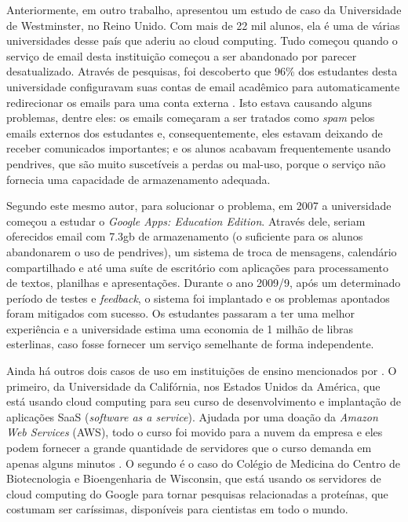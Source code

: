 Anteriormente, em outro trabalho, 
apresentou um estudo de caso da
Universidade de Westminster, no Reino Unido. Com mais de 22 mil alunos, ela é
uma de várias universidades desse país que aderiu ao cloud computing. Tudo
começou quando o serviço de email desta instituição começou a ser abandonado por
parecer desatualizado. Através de pesquisas, foi descoberto que 96\% dos
estudantes desta universidade configuravam suas contas de email acadêmico para
automaticamente redirecionar os emails para uma conta externa
\cite{article-cloud-education-new-dawn}. Isto estava causando alguns problemas,
dentre eles: os emails começaram a ser tratados como \textit{spam} pelos emails
externos dos estudantes e, consequentemente, eles estavam deixando de receber
comunicados importantes; e os alunos acabavam frequentemente usando pendrives,
que são muito suscetíveis a perdas ou mal-uso, porque o serviço não fornecia
uma capacidade de armazenamento adequada.

Segundo este mesmo autor, para solucionar o problema, em 2007 a universidade
começou a estudar o \textit{Google Apps: Education Edition}. Através dele,
seriam oferecidos email com 7.3gb de armazenamento (o suficiente para os alunos
abandonarem o uso de pendrives), um sistema de troca de mensagens, calendário
compartilhado e até uma suíte de escritório com aplicações para processamento de
textos, planilhas e apresentações. Durante o ano 2009/9, após um determinado
período de testes e \textit{feedback}, o sistema foi implantado e os
problemas apontados foram mitigados com sucesso. Os estudantes passaram a ter
uma melhor experiência e a universidade estima uma economia de 1 milhão
de libras esterlinas, caso fosse fornecer um serviço semelhante de forma
independente.

Ainda há outros dois casos de uso em instituições de ensino mencionados por
. O primeiro, da Universidade da
Califórnia, nos Estados Unidos da América, que está usando cloud computing
para seu curso de desenvolvimento e implantação de aplicações SaaS
(\textit{software as a service}). Ajudada por uma doação da \textit{Amazon Web
Services} (AWS), todo o curso foi movido para a nuvem da empresa e eles podem
fornecer a grande quantidade de servidores que o curso demanda em apenas alguns
minutos \cite{site-cloud-education}. O segundo é o caso do Colégio de Medicina
do Centro de Biotecnologia e Bioengenharia de Wisconsin, que está usando os
servidores de cloud computing do Google para tornar pesquisas relacionadas a
proteínas, que costumam ser caríssimas, disponíveis para cientistas em todo o
mundo.

